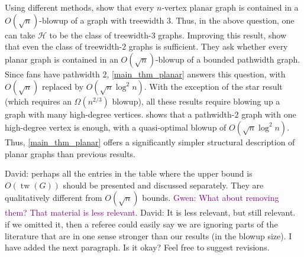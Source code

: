\documentclass{patmorin}
\newcommand{\david}[1]{{\color{orange} David: #1}}
\newcommand{\pat}[1]{\textcolor{Blue}{Pat: #1}}
\newcommand{\gwen}[1]{\textcolor{Purple}{Gwen: #1}}
\DeclareMathOperator{\tw}{tw}
\begin{document}



Using different methods, \citet{ISW} show that every $n$-vertex planar graph is contained in a $O(\sqrt{n})$-blowup of a graph with treewidth 3. Thus, in the above question, one can take $\mathcal{H}$ to be the class of treewidth-$3$ graphs. Improving this result, \citet{distel.dujmovic.ea:product} show that even the class of treewidth-$2$ graphs is sufficient. They  ask whether every planar graph is contained in an $O(\sqrt{n})$-blowup of a bounded pathwidth graph.
Since fans have pathwidth $2$, \cref{main_thm_planar} answers this question, with $O(\sqrt{n})$ replaced by $O(\sqrt{n}\log^2 n)$.  With the exception of the star result (which requires an $\Omega(n^{2/3})$ blowup), all these results require blowing up a graph with many high-degree vertices.   shows that a pathwidth-$2$ graph with one high-degree vertex is enough, with a quasi-optimal blowup of $O(\sqrt{n}\log^2 n)$.  Thus, \cref{main_thm_planar} offers a significantly simpler structural description of planar graphs than previous results.



\david{perhaps all the entries in the table where the upper bound is $O(\tw(G))$ should be presented and discussed separately. They are qualitatively different from $O(\sqrt{n})$ bounds.}
\gwen{What about removing them? That material is less relevant.} \david{It is less relevant, but still relevant. if we omitted it, then a referee could easily say we are ignoring parts of the literature that are in one sense stronger than our results (in the blowup size). I have added the next paragraph. Is it okay? Feel free to suggest revisions.}

\end{document}
